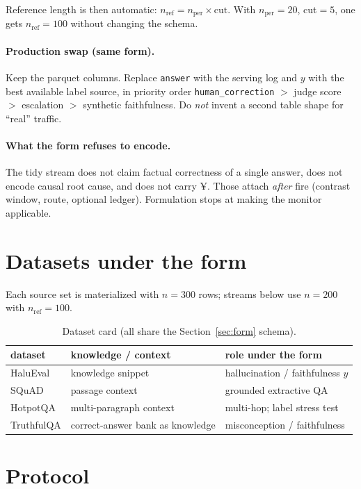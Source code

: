 \documentclass[11pt]{article}
\begin{document}
Reference length is then automatic:
$n_{\mathrm{ref}}=n_{\mathrm{per}}\times\mathrm{cut}$.
With $n_{\mathrm{per}}=20$, cut$=5$, one gets $n_{\mathrm{ref}}=100$ without
changing the schema.

\paragraph{Production swap (same form).}
Keep the parquet columns. Replace \texttt{answer} with the serving log and $y$
with the best available label source, in priority order
\texttt{human\_correction} $>$ judge score $>$ escalation $>$ synthetic
faithfulness. Do \emph{not} invent a second table shape for ``real'' traffic.

\paragraph{What the form refuses to encode.}
The tidy stream does not claim factual correctness of a single answer, does not
encode causal root cause, and does not carry ¥. Those attach \emph{after} fire
(contrast window, route, optional ledger). Formulation stops at making the
monitor applicable.

\section{Datasets under the form}
Each source set is materialized with $n=300$ rows; streams below use $n=200$
with $n_{\mathrm{ref}}=100$.

\begin{table}[h]
\centering
\caption{Dataset card (all share the Section~\ref{sec:form} schema).}
\begin{tabular}{lll}
\toprule
dataset & knowledge / context & role under the form \\
\midrule
HaluEval & knowledge snippet & hallucination / faithfulness $y$ \\
SQuAD & passage context & grounded extractive QA \\
HotpotQA & multi-paragraph context & multi-hop; label stress test \\
TruthfulQA & correct-answer bank as knowledge & misconception / faithfulness \\
\bottomrule
\end{tabular}
\end{table}

\section{Protocol}
\end{document}
